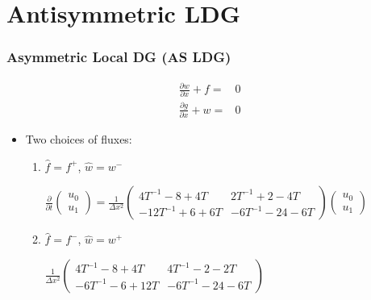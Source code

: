\documentclass[serif,12pt]{beamer}
\begin{document}
\section{Antisymmetric LDG}
\begin{frame}
\frametitle{Asymmetric Local DG (AS LDG)}
\begin{align*}
\frac{\partial w}{\partial x} + f =& 0\\
\frac{\partial g}{\partial x} + w =& 0
\end{align*}
\begin{itemize}
	\item Two choices of fluxes:
	\begin{enumerate}
		\item $\hat{f} = f^+$, $\hat{w} = w^-$\\
		\begin{center}
		$\frac{\partial}{\partial t}\left(\begin{array}{cc}u_0\\u_1
		\end{array}\right) = \frac{1}{\Delta x^2}\left(
		\begin{array}{cc}
		4T^{-1} -8+4 T & 2T^{-1}+2-4 T \\
		 -12 T^{-1} +6+6 T & -6 T^{-1} -24-6 T
		\end{array}\right)\left(\begin{array}{c}
		u_0 \\
		 u_1 
		\end{array}
		\right)$
		\end{center}
		\item $\hat{f} = f^-$, $\hat{w} = w^+$\\
		\begin{center}
		$\frac{1}{\Delta x^2}\left(
		\begin{array}{cc}
		4T^{-1} -8+4 T & 4T^{-1}-2-2 T \\
		 -6 T^{-1} -6+12 T & -6 T^{-1} -24-6 T
		\end{array}
		\right)$
		\end{center}
	\end{enumerate}
\end{itemize}
\end{frame}
\end{document}

